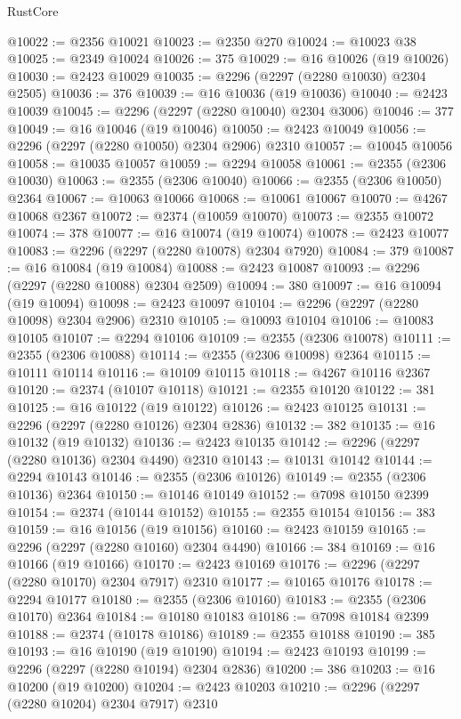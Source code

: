 \begin{lexlean}{RustCore}
\begin{coremodule}
@10022 := @2356 @10021
@10023 := @2350 @270
@10024 := @10023 @38
@10025 := @2349 @10024
@10026 := 375
@10029 := @16 @10026 (@19 @10026)
@10030 := @2423 @10029
@10035 := @2296 (@2297 (@2280 @10030) @2304 @2505)
@10036 := 376
@10039 := @16 @10036 (@19 @10036)
@10040 := @2423 @10039
@10045 := @2296 (@2297 (@2280 @10040) @2304 @3006)
@10046 := 377
@10049 := @16 @10046 (@19 @10046)
@10050 := @2423 @10049
@10056 := @2296 (@2297 (@2280 @10050) @2304 @2906) @2310
@10057 := @10045 @10056
@10058 := @10035 @10057
@10059 := @2294 @10058
@10061 := @2355 (@2306 @10030)
@10063 := @2355 (@2306 @10040)
@10066 := @2355 (@2306 @10050) @2364
@10067 := @10063 @10066
@10068 := @10061 @10067
@10070 := @4267 @10068 @2367
@10072 := @2374 (@10059 @10070)
@10073 := @2355 @10072
@10074 := 378
@10077 := @16 @10074 (@19 @10074)
@10078 := @2423 @10077
@10083 := @2296 (@2297 (@2280 @10078) @2304 @7920)
@10084 := 379
@10087 := @16 @10084 (@19 @10084)
@10088 := @2423 @10087
@10093 := @2296 (@2297 (@2280 @10088) @2304 @2509)
@10094 := 380
@10097 := @16 @10094 (@19 @10094)
@10098 := @2423 @10097
@10104 := @2296 (@2297 (@2280 @10098) @2304 @2906) @2310
@10105 := @10093 @10104
@10106 := @10083 @10105
@10107 := @2294 @10106
@10109 := @2355 (@2306 @10078)
@10111 := @2355 (@2306 @10088)
@10114 := @2355 (@2306 @10098) @2364
@10115 := @10111 @10114
@10116 := @10109 @10115
@10118 := @4267 @10116 @2367
@10120 := @2374 (@10107 @10118)
@10121 := @2355 @10120
@10122 := 381
@10125 := @16 @10122 (@19 @10122)
@10126 := @2423 @10125
@10131 := @2296 (@2297 (@2280 @10126) @2304 @2836)
@10132 := 382
@10135 := @16 @10132 (@19 @10132)
@10136 := @2423 @10135
@10142 := @2296 (@2297 (@2280 @10136) @2304 @4490) @2310
@10143 := @10131 @10142
@10144 := @2294 @10143
@10146 := @2355 (@2306 @10126)
@10149 := @2355 (@2306 @10136) @2364
@10150 := @10146 @10149
@10152 := @7098 @10150 @2399
@10154 := @2374 (@10144 @10152)
@10155 := @2355 @10154
@10156 := 383
@10159 := @16 @10156 (@19 @10156)
@10160 := @2423 @10159
@10165 := @2296 (@2297 (@2280 @10160) @2304 @4490)
@10166 := 384
@10169 := @16 @10166 (@19 @10166)
@10170 := @2423 @10169
@10176 := @2296 (@2297 (@2280 @10170) @2304 @7917) @2310
@10177 := @10165 @10176
@10178 := @2294 @10177
@10180 := @2355 (@2306 @10160)
@10183 := @2355 (@2306 @10170) @2364
@10184 := @10180 @10183
@10186 := @7098 @10184 @2399
@10188 := @2374 (@10178 @10186)
@10189 := @2355 @10188
@10190 := 385
@10193 := @16 @10190 (@19 @10190)
@10194 := @2423 @10193
@10199 := @2296 (@2297 (@2280 @10194) @2304 @2836)
@10200 := 386
@10203 := @16 @10200 (@19 @10200)
@10204 := @2423 @10203
@10210 := @2296 (@2297 (@2280 @10204) @2304 @7917) @2310

\end{coremodule}
\end{lexlean}
